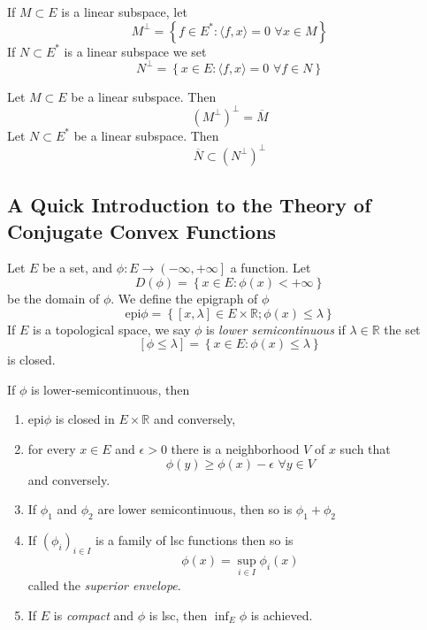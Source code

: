 \begin{defn}
If $M \subset E$ is a linear subspace, let
\[
M^{\perp} = \left\{ f \in E^*: \langle f,x \rangle =0 \hspace{4pt} \forall x \in M \right\}
\]
If $N \subset E^*$ is a linear subspace we set
\[
N^{\perp} = \left\{ x \in E: \langle f,x \rangle = 0 \hspace{4pt} \forall f \in N \right\}
\]

\end{defn}

\begin{prop}
Let $M \subset E$ be a linear subspace. Then
\[
	\left( M^{\perp} \right)^{\perp} = \overline{M}
\]
Let $N \subset E^*$ be a linear subspace. Then
\[
	\overline{N} \subset \left( N^{\perp} \right)^{\perp}
\]

\end{prop}

\subsection{A Quick Introduction to the Theory of Conjugate Convex Functions}

\begin{defn}
	Let $E$ be a set, and $ \phi: E \to \left( - \infty, + \infty \right]$ a function. Let
	\[
		D( \phi) = \left\{ x \in E: \phi(x) < + \infty \right\}
	\]
	be the domain of $ \phi$. We define the epigraph of $ \phi$
	\[
		\mathrm{epi} \phi = \left\{ \left[ x, \lambda \right] \in E \times \mathbb{R}; \phi(x) \leq \lambda \right\}
	\]
	If $E$ is a topological space, we say $ \phi$ is \textit{lower semicontinuous} if $ \lambda \in \mathbb{R}$ the set
	\[
		\left[ \phi \leq \lambda \right] = \left\{ x \in E: \phi(x) \leq \lambda \right\}
	\]
	is closed.
\end{defn}


\begin{prop}
	If $ \phi$ is lower-semicontinuous, then 
\begin{enumerate}
	\item $ \mathrm{epi} \phi$ is closed in $ E \times \mathbb{R}$ and conversely,
	\item for every $x \in E$ and $ \epsilon>0$ there is a neighborhood $V$ of $x$ such that
		\[
			\phi(y) \geq \phi(x) - \epsilon \hspace{4pt} \forall y \in V
		\]
		and conversely.
	\item If $ \phi_1$ and $ \phi_2$ are lower semicontinuous, then so is $ \phi_1 + \phi_2$
	\item If $ \left( \phi_i \right)_{i \in I}$ is a family of lsc functions then so is
		\[
			\phi(x) = \sup_{i \in I} \phi_i (x)
		\]
		called the \textit{superior envelope}. 
	\item If $E$ is \textit{compact} and $ \phi$ is lsc, then $ \inf_E \phi$ is achieved.
\end{enumerate}
\end{prop}

